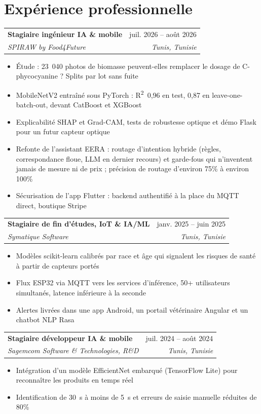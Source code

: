 \documentclass[a4paper,11pt]{article}
\makeatletter
\newcommand{\role}[4]{%
  \begin{tabular*}{\linewidth}{l@{\extracolsep{\fill}}r}
    \textbf{#1} & #2 \\
    \textit{#3} & \textit{#4} \\
  \end{tabular*}\par}
\newenvironment{points}{\begin{itemize}[leftmargin=1.4em,itemsep=1pt,topsep=2pt,parsep=0pt]\small}{\end{itemize}\vspace{4pt}}
\makeatother
\begin{document}
\section{Expérience professionnelle}
\role{Stagiaire ingénieur IA \& mobile}{juil. 2026 -- août 2026}{SPIRAW by Food4Future}{Tunis, Tunisie}
\begin{points}
  \item Étude : 23~040 photos de biomasse peuvent-elles remplacer le dosage de C-phycocyanine ? Splits par lot sans fuite
  \item MobileNetV2 entraîné sous PyTorch : R\textsuperscript{2}~0,96 en test, 0,87 en leave-one-batch-out, devant CatBoost et XGBoost
  \item Explicabilité SHAP et Grad-CAM, tests de robustesse optique et démo Flask pour un futur capteur optique
  \item Refonte de l'assistant EERA : routage d'intention hybride (règles, correspondance floue, LLM en dernier recours) et
        garde-fous qui n'inventent jamais de mesure ni de prix ; précision de routage d'environ 75\% à environ 100\%
  \item Sécurisation de l'app Flutter : backend authentifié à la place du MQTT direct, boutique Stripe
\end{points}
\role{Stagiaire de fin d'études, IoT \& IA/ML}{janv. 2025 -- juin 2025}{Symatique Software}{Tunis, Tunisie}
\begin{points}
  \item Modèles scikit-learn calibrés par race et âge qui signalent les risques de santé à partir de capteurs portés
  \item Flux ESP32 via MQTT vers les services d'inférence, 50+ utilisateurs simultanés, latence inférieure à la seconde
  \item Alertes livrées dans une app Android, un portail vétérinaire Angular et un chatbot NLP Rasa
\end{points}
\role{Stagiaire développeur IA \& mobile}{juil. 2024 -- août 2024}{Sagemcom Software \& Technologies, R\&D}{Tunis, Tunisie}
\begin{points}
  \item Intégration d'un modèle EfficientNet embarqué (TensorFlow Lite) pour reconnaître les produits en temps réel
  \item Identification de 30~s à moins de 5~s et erreurs de saisie manuelle réduites de 80\%
\end{points}
\end{document}
